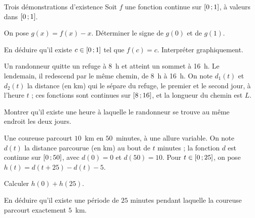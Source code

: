 \begin{exercice}[3]{Trois démonstrations d'existence}
Soit $f$ une fonction continue sur $\mathopen{[}0\,{;}\,1\mathclose{]}$, à valeurs dans $\mathopen{[}0\,{;}\,1\mathclose{]}$.
\begin{questions}
  \item On pose $g(x)=f(x)-x$. Déterminer le signe de $g(0)$ et de $g(1)$.
  \item En déduire qu'il existe $c\in\mathopen{[}0\,{;}\,1\mathclose{]}$ tel que $f(c)=c$. Interpréter graphiquement.
\end{questions}
Un randonneur quitte un refuge à 8~h et atteint un sommet à 16~h. Le lendemain, il redescend par le même chemin, de 8~h à
16~h. On note $d_1(t)$ et $d_2(t)$ la distance (en km) qui le sépare du refuge, le premier et le second jour, à l'heure $t$ ;
ces fonctions sont continues sur $\mathopen{[}8\,{;}\,16\mathclose{]}$, et la longueur du chemin est $L$.
\begin{questions}[resume]
  \item Montrer qu'il existe une heure à laquelle le randonneur se trouve au même endroit les deux jours.
\end{questions}
Une coureuse parcourt $10$~km en $50$~minutes, à une allure variable. On note $d(t)$ la distance parcourue (en km) au bout de
$t$ minutes ; la fonction $d$ est continue sur $\mathopen{[}0\,{;}\,50\mathclose{]}$, avec $d(0)=0$ et $d(50)=10$. Pour $t\in\mathopen{[}0\,{;}\,25\mathclose{]}$, on pose
$h(t)=d(t+25)-d(t)-5$.
\begin{questions}[resume]
  \item Calculer $h(0)+h(25)$.
  \item En déduire qu'il existe une période de $25$ minutes pendant laquelle la coureuse parcourt exactement $5$~km.
\end{questions}
\end{exercice}
